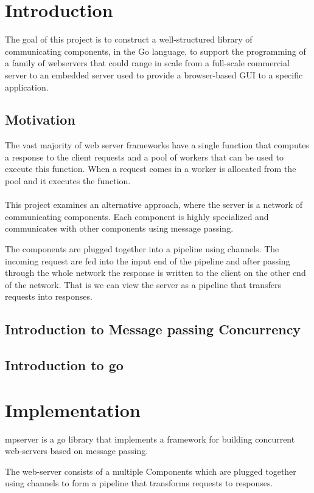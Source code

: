 \documentclass[12pt,a4paper]{article}
\begin{document}
\section{Introduction}
The goal of this project is to construct a well-structured
library of communicating components, in the Go language, to support
the programming of a family of webservers that could range in scale from a full-scale commercial server to an embedded server used to provide a browser-based GUI to a specific application.

\subsection{Motivation}
The vast majority of web server frameworks have a single function that
computes a response to the client requests and a pool of workers that can
be used to execute this function. When a request comes in a worker is 
allocated from the pool and it executes the function.
\\
\\
This project examines an alternative approach, where the server is a network 
of communicating components. Each component is highly specialized and communicates
with other components using message passing.

The components are plugged together into a pipeline using channels.
The incoming request are fed into the input end of the pipeline and 
after passing through the whole network the response is written to the
client on the other end of the network. That is we can view the server
as a pipeline that transfers requests into responses.

\subsection{Introduction to Message passing Concurrency}

\subsection{Introduction to go}

\newpage
\section{Implementation}

mpserver is a go library that implements a framework for building 
concurrent web-servers based on message passing.

The web-server consists of a multiple Components which are plugged 
together using channels to form a pipeline that transforms requests 
to responses.
\end{document}
